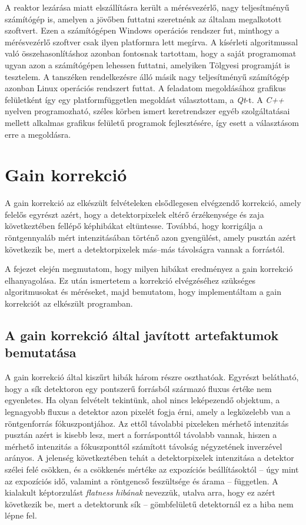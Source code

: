 \documentclass[a4paper,12pt]{article}
\begin{document}
A reaktor lezárása miatt elszállításra került a mérésvezérlő, nagy teljesítményű  számítógép is, amelyen a jövőben futtatni szeretnénk az általam megalkotott szoftvert.  Ezen a számítógépen Windows operációs rendszer fut, minthogy a mérésvezérlő szoftver csak ilyen platformra lett megírva. A kísérleti algoritmussal való összehasonlításhoz azonban fontosnak tartottam, hogy a saját programomat ugyan azon a számítógépen lehessen futtatni, amelyiken Tölgyesi programját is tesztelem. A tanszéken rendelkezésre álló másik nagy teljesítményű számítógép azonban Linux operációs rendszert futtat. A feladatom megoldásához grafikus felületként így egy platformfüggetlen megoldást választottam, a \emph{Qt}-t. A \emph{C++} nyelven programozható, széles körben ismert keretrendszer egyéb szolgáltatásai mellett alkalmas grafikus felületű programok  fejlesztésére, így esett a választásom erre a megoldásra.




\section{Gain korrekció}
\label{sec:gainkorr}


A gain korrekció az elkészült felvételeken elsődlegesen elvégzendő korrekció, amely felelős egyrészt azért, hogy a detektorpixelek eltérő érzékenysége és zaja következtében fellépő képhibákat eltüntesse. Továbbá, hogy korrigálja a röntgennyaláb mért intenzitásában történő azon gyengülést, amely pusztán azért következik be, mert a detektorpixelek más--más távolságra vannak a forrástól.

A fejezet elején megmutatom, hogy milyen hibákat eredményez a gain korrekció elhanyagolása. Ez után ismertetem a korrekció elvégzéséhez szükséges algoritmusokat és méréseket, majd bemutatom, hogy implementáltam a gain korrekciót az elkészült programban. 

\subsection{A gain korrekció által javított artefaktumok bemutatása}

A gain korrekció által kiszűrt hibák három részre oszthatóak. Egyrészt belátható, hogy a sík detektoron egy pontszerű forrásból származó fluxus értéke nem egyenletes. Ha olyan felvételt tekintünk, ahol nincs leképezendő objektum, a legnagyobb fluxus a detektor azon pixelét fogja érni, amely a legközelebb van a röntgenforrás fókuszpontjához. Az ettől távolabbi pixeleken mérhető intenzitás pusztán azért is kisebb lesz, mert a forrásponttól távolabb vannak, hiszen a mérhető intenzitás a fókuszponttól számított távolság négyzetének inverzével arányos. A jelenség következtében tehát a detektorpixelek intenzitása a detektor szélei felé csökken, és a csökkenés mértéke az expozíciós beállításoktól -- úgy mint az expozíciós idő, valamint a röntgencső feszültsége és árama -- független. A kialakult képtorzulást \emph{flatness hibának} nevezzük, utalva arra, hogy ez azért következik be, mert a detektorunk sík -- gömbfelületű detektornál ez a hiba nem lépne fel.
\end{document}
